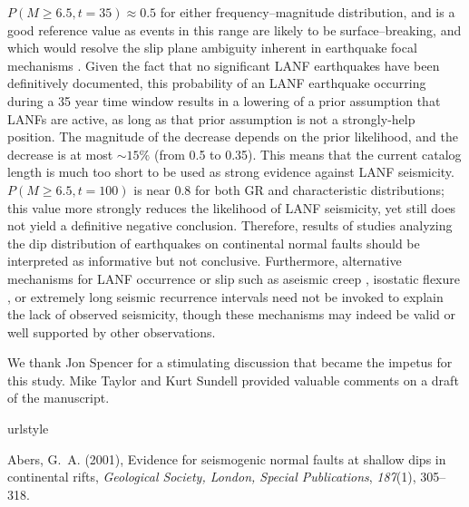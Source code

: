 \documentclass[draft,grl]{AGUTeX}
\begin{document}
\begin{article}
$P(M \ge  6.5, t = 35) \approx 0.5$ for either frequency–magnitude distribution,
and is a good reference value as events in this range are likely to be
surface–breaking, and which would resolve the slip plane ambiguity inherent in
earthquake focal mechanisms \citep{hecker2013eqdist}. Given the fact that no
significant LANF earthquakes have been definitively documented, this
probability of an LANF earthquake occurring during a 35 year time window
results in a lowering of a prior assumption that LANFs are active, as long as
that prior assumption is not a strongly-help position. The magnitude of the
decrease depends on the prior likelihood, and the decrease is at most $\sim 15
\%$ (from 0.5 to 0.35). This means that the current catalog length is much too
short to be used as strong evidence against LANF seismicity.  $P(M\ge6.5,
t=100)$ is near 0.8 for both GR and characteristic distributions; this value
more strongly reduces the likelihood of LANF seismicity, yet still does not
yield a definitive negative conclusion.  Therefore, results of studies
analyzing the dip distribution of earthquakes on continental normal faults
\citep{jackson1987, collettinisibson2001} should be interpreted as informative
but not conclusive. Furthermore, alternative mechanisms for LANF occurrence or
slip such as aseismic creep \citep [e.g.,][]{collettini2011lanfmech,
hreinsdottir2009altotib}, isostatic flexure \citep[e.g.,][]
{wernickeaxen1988rolling}, or extremely long seismic recurrence intervals
\citep{wernicke1995seis} need not be invoked to explain the lack of observed
seismicity, though these mechanisms may indeed be valid or well supported by
other observations.



\begin{acknowledgements}
  We thank Jon Spencer for a stimulating discussion that became the impetus for
  this study.  Mike Taylor and Kurt Sundell provided valuable comments on
  a draft of the manuscript. 
 
\end{acknowledgements}

\begin{thebibliography}{32}
\providecommand{\natexlab}[1]{#1}
\expandafter\ifx\csname urlstyle\endcsname\relax
  \providecommand{\doi}[1]{doi:\discretionary{}{}{}#1}\else
  \providecommand{\doi}{doi:\discretionary{}{}{}\begingroup
  \urlstyle{rm}\Url}\fi

Abers, G.~A. (2001), Evidence for seismogenic normal faults at shallow dips in
  continental rifts, \textit{Geological Society, London, Special Publications},
  \textit{187}(1), 305--318.


\end{thebibliography}
\end{article}
\end{document}
